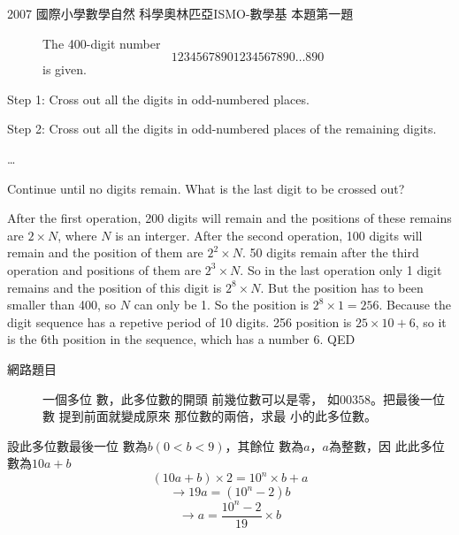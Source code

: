 \documentclass[12pt]{article}
\begin{document}
%

\begin{description}
\item[2007 國際小學數學自然%
科學奧林匹亞ISMO-數學基%
本題第一題] The 400-digit number 
\[
12345678901234567890\ldots 890 
\]
is given.
\end{description}

Step 1: Cross out all the digits in odd-numbered places.

Step 2: Cross out all the digits in odd-numbered places of the remaining
digits.

\ldots

Continue until no digits remain. What is the last digit to be crossed out?

\bigskip

After the first operation, 200 digits will remain and the positions of these
remains are $2\times N$, where $N$ is an interger. After the second
operation, 100 digits will remain and the position of them are $2^{2}\times
N $. 50 digits remain after the third operation and positions of them are $%
2^{3}\times N$. So in the last operation only 1 digit remains and the
position of this digit is $2^{8}\times N$. But the position has to been
smaller than 400, so $N$ can only be 1. So the position is $2^{8}\times
1=256 $. Because the digit sequence has a repetive period of 10 digits. 256
position is $25\times 10+6$, so it is the 6th position in the sequence,
which has a number 6. QED

\newpage

\begin{description}
\item[網路題目] 一個多位%
數，此多位數的開頭%
前幾位數可以是零，%
如$00358$。把最後一位數%
提到前面就變成原來%
那位數的兩倍，求最%
小的此多位數。
\end{description}

\bigskip

\bigskip

設此多位數最後一位%
數為$b\left( 0<b<9\right) $，其餘位%
數為$a$，$a$為整數，因%
此此多位數為$10a+b$%
\[
\left( 10a+b\right) \times 2=10^{n}\times b+a 
\]%
\[
\rightarrow 19a=\left( 10^{n}-2\right) b 
\]%
\[
\rightarrow a=\frac{10^{n}-2}{19}\times b 
\]
\end{document}
